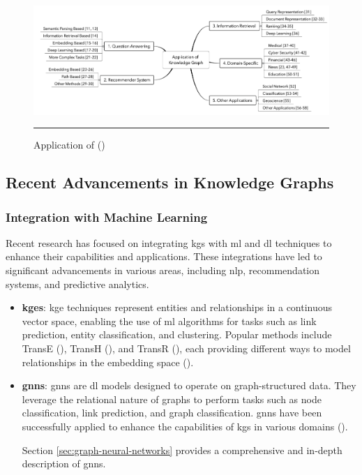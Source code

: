 \begin{figure}[htbp]
	   \centering
    \includegraphics[width=\textwidth]{03_Figures/literature-review/kg-application-fields.png}
		\rule{35em}{0.5pt}
	   \caption{Application of  (\cite{Zou2020})} 
    \label{fig:kg-application-fields}
\end{figure}

\subsection*{Recent Advancements in Knowledge Graphs}

\subsubsection*{Integration with Machine Learning}
Recent research has focused on integrating \glspl{kg} with \gls{ml} and \gls{dl} techniques to enhance their capabilities and applications. These integrations have led to significant advancements in various areas, including \gls{nlp}, recommendation systems, and predictive analytics.
\begin{itemize}
    \item \textbf{\glspl{kge}}: \gls{kge} techniques represent entities and relationships in a continuous vector space, enabling the use of \gls{ml} algorithms for tasks such as link prediction, entity classification, and clustering. Popular methods include TransE (\cite{Bordes2013}), TransH (\cite{Wang2014}), and TransR (\cite{Lin2015}), each providing different ways to model relationships in the embedding space (\cite{Wang2017}).
    \item \textbf{\glspl{gnn}}: \glspl{gnn} are \gls{dl} models designed to operate on graph-structured data. They leverage the relational nature of graphs to perform tasks such as node classification, link prediction, and graph classification. \glspl{gnn} have been successfully applied to enhance the capabilities of \glspl{kg} in various domains (\cite{Wu2021}).
    
    Section \ref{sec:graph-neural-networks} provides a comprehensive and in-depth description of \glspl{gnn}.
\end{itemize}


